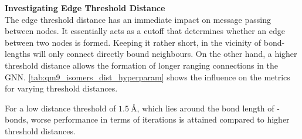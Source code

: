 \textbf{Investigating Edge Threshold Distance}\\
The edge threshold distance has an immediate impact on message passing between nodes. It essentially acts as a cutoff that determines whether an edge between two nodes is formed. Keeping it rather short, in the vicinity of bond-lengths will only connect directly bound neighbours. On the other hand, a higher threshold distance allows the formation of longer ranging connections in the GNN. \autoref{tab:qm9_isomers_dist_hyperparam} shows the influence on the metrics for varying threshold distances.  
\begin{table}[H]
    \centering
    \caption[GNN on QM9 isomers with different edge threshold distances]{GNN performance on QM9  isomers test set for different edge threshold distances (given in $\unit{\angstrom}$). Other hyperparameters are set according to \autoref{tab:init_hparams}.}
    \label{tab:qm9_isomers_dist_hyperparam}
\end{table}
For a low distance threshold of $\SI{1.5}{\angstrom}$, which lies around the bond length of - bonds, worse performance in terms of iterations is attained compared to higher threshold distances. 

